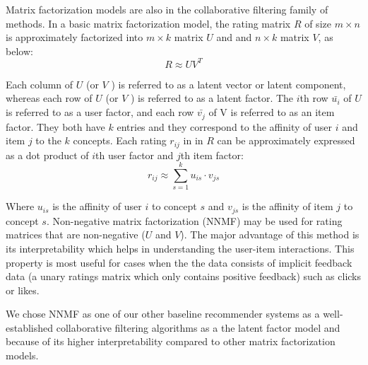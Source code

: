        Matrix factorization models \cite{koren20009mf} are also in the collaborative filtering family of methods. In a basic matrix factorization model, the rating matrix $R$ of size $m\times n$ is approximately factorized into $m\times k$ matrix $U$ and and $n\times k$ matrix $V$, as below:
       \begin{equation}
           R\approx UV^T
       \end{equation}
       
       Each column of $U$ (or $V$ ) is referred to as a latent vector or latent component, whereas each row of $U$ (or $V$ ) is referred to as a latent factor. The $i$th row $\bar{u_i}$ of $U$ is referred to as a user factor, and each row $\bar{v_j}$ of V is referred to as an item factor. They both have $k$ entries and they correspond to the affinity of user $i$ and item $j$ to the $k$ concepts.
       Each rating $r_{ij}$ in in $R$ can be approximately expressed as a dot product of $i$th user factor and $j$th item factor:
       \begin{equation}
           r_{ij} \approx \sum_{s=1}^{k} u_{is} \cdot v_{js}
       \end{equation}
       
       Where $u_{is}$ is the affinity of user $i$ to concept $s$ and $v_{js}$ is the affinity of item $j$ to concept $s$. 
       Non-negative matrix factorization (NNMF) \cite{lee2001algorithms,zhang2006learning} may be used for rating matrices that are non-negative ($U$ and $V$). The major advantage of this method is its interpretability which helps in understanding the user-item interactions. This property is most useful for cases when the the data consists of implicit feedback data (a unary ratings matrix which only contains positive feedback) such as clicks or likes.
       
       We chose NNMF as one of our other baseline recommender systems as a well-established collaborative filtering algorithms as a the latent factor model and because of its higher interpretability compared to other matrix factorization models.
       
       

        
        
